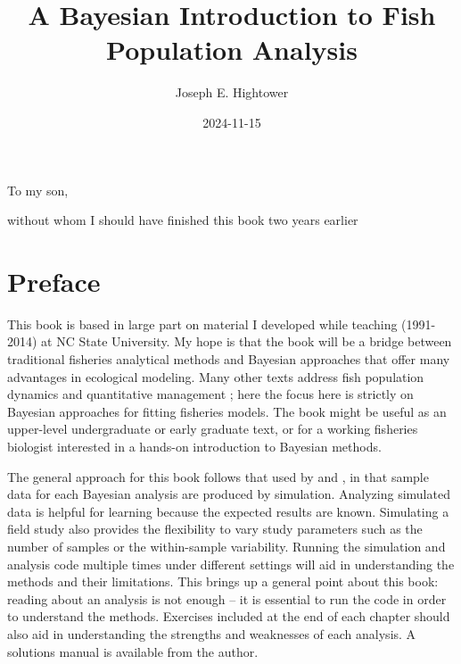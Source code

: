 \documentclass[
]{krantz}
\title{A Bayesian Introduction to Fish Population Analysis}
\author{Joseph E. Hightower}
\date{2024-11-15}
\begin{document}
\maketitle


\thispagestyle{empty}

\begin{center}
To my son,

without whom I should have finished this book two years earlier
\end{center}

\setlength{\abovedisplayskip}{-5pt}
\setlength{\abovedisplayshortskip}{-5pt}

{
\hypersetup{linkcolor=}
\setcounter{tocdepth}{2}
\tableofcontents
}
\listoffigures
\listoftables
\hypertarget{preface}{%
\chapter*{Preface}\label{preface}}


This book is based in large part on material I developed while teaching (1991-2014) at NC State University. My hope is that the book will be a bridge between traditional fisheries analytical methods and Bayesian approaches that offer many advantages in ecological modeling. Many other texts address fish population dynamics and quantitative management \citep[e.g.,][]{hilborn.walters_1992, quinn.deriso_1999}; here the focus here is strictly on Bayesian approaches for fitting fisheries models. The book might be useful as an upper-level undergraduate or early graduate text, or for a working fisheries biologist interested in a hands-on introduction to Bayesian methods.

The general approach for this book follows that used by \citet{kéry_2010} and \citet{kéry.schaub_2011}, in that sample data for each Bayesian analysis are produced by simulation. Analyzing simulated data is helpful for learning because the expected results are known. Simulating a field study also provides the flexibility to vary study parameters such as the number of samples or the within-sample variability. Running the simulation and analysis code multiple times under different settings will aid in understanding the methods and their limitations. This brings up a general point about this book: reading about an analysis is not enough -- it is essential to run the code in order to understand the methods. Exercises included at the end of each chapter should also aid in understanding the strengths and weaknesses of each analysis. A solutions manual is available from the author.
\end{document}
